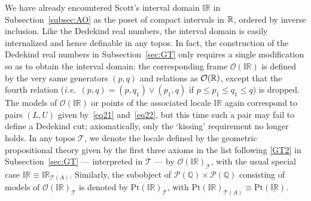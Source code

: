 \documentclass[12pt]{article}
\newcommand{\IR}{\mathbb{IR}}
\newcommand{\Q}{\mathbb{Q}}
\newcommand{\x}{\times} \newcommand{\hb}{\hbar}
\newcommand{\er}{\eqref}
\newcommand{\CO}{{\mathcal O}} \newcommand{\CP}{{\mathcal P}}
\newcommand{\CT}{{\mathcal T}} \newcommand{\CV}{{\mathcal V}}
\newcommand{\alg}[1]{\ensuremath{#1}}
\newcommand{\asstopos}{\ensuremath{\mathcal{T}}}
\newcommand{\TA}{\mathcal{T}(A)}
\newcommand{\ie}{\textit{i.e.}}
\renewcommand{\TA}{\asstopos(\alg{A})}
\begin{document}
We have already encountered Scott's interval domain $\IR$ in
Subsection~\ref{subsec:AO} as the poset of compact intervals in ${\mathbb R}$,
ordered by inverse inclusion. Like the Dedekind real numbers, the interval
domain is easily internalized and hence definable in any topos. In
fact, the construction of the Dedekind real numbers in
Subsection~\ref{sec:GT} only requires a single modification so as to
obtain the interval domain: the corresponding frame  $\CO(\IR)$ is
defined by the very same generators $(p,q)$ and relations as
$\CO(\R)$, except that the fourth relation (\ie\ $(p,q)=(p,q_1)\vee (p_1,q)$ if $p\leqslant p_1\leqslant q_1\leqslant q$)
is dropped. The models of
$\CO(\IR)$ or points of the associated locale $\IR$ again correspond
to pairs $(L,U)$ given by~\er{eq21} and~\er{eq22}, but this time such
a pair may fail to define a Dedekind
cut; axiomatically, only the `kissing' requirement no longer holds.
In any topos $\CT$, we denote the locale defined by the geometric propositional  theory given by 
the first three axioms in the list following \er{GT2}   in
Subsection~\ref{sec:GT} --- interpreted in $\CT$ --- by $\CO(\IR)_{\CT}$, with the usual special case $\underline{\IR}\equiv\IR_{\TA}$. 
Similarly, the  subobject of $\CP(\Q)\x\CP(\Q)$
consisting of models  of $\CO(\IR)_{\CT}$ is denoted by
$\mathrm{Pt}(\IR)_{\CT}$, with $\mathrm{Pt}(\IR)_{\TA}\equiv \mathrm{Pt}(\underline{\IR})$.
\end{document}
